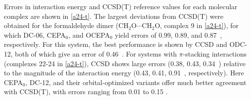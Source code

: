 Errors in interaction energy and CCSD(T) reference values for each molecular
complex are shown in \cref{a24-t}.
The largest deviations from CCSD(T) were obtained for the formaldehyde dimer
($\mathrm{CH_2O }\cdots\mathrm{CH_2O }$, complex 9 in \cref{a24-t}), for which
DC-06, CEPA$_0$, and OCEPA$_0$ yield errors of 0.99, 0.89, and 0.87~\kcal,
respectively.
For this system, the best performance is shown by CCSD and ODC-12, both of which
give an error of 0.46~\kcal.
For systems with $\pi$-stacking interactions (complexes 22-24 in \cref{a24-t}),
CCSD shows large errors (0.38, 0.43, 0.34~\kcal) relative to the magnitude of
the interaction energy (0.43, 0.41, 0.91~\kcal, respectively).
Here CEPA$_0$, DC-12, and their orbital-optimized variants offer much better
agreement with CCSD(T), with errors ranging from 0.01 to 0.15 \kcal.


